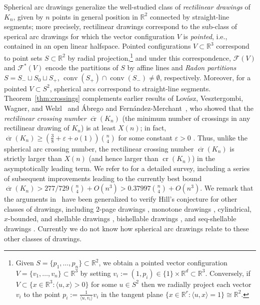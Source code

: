 \documentclass[11pt]{article}
\DeclareMathOperator{\conv}{conv}
\DeclareMathOperator{\cross}{cr}
\renewcommand{\geq}{\geqslant}
\newcommand{\R}{\mathbb{R}}
\begin{document}
%
Spherical arc drawings generalize the well-studied class of \emph{rectilinear drawings} of $K_n$, given by $n$ points in general position in $\R^2$ connected by straight-line segments; more precisely, rectilinear drawings correspond to the sub-class of sperical arc drawings for which the vector configuration $V$ is \emph{pointed}, i.e., contained in an open linear halfspace. Pointed configurations $V\subset \R^3$ correspond to point sets $S\subset \R^2$ by radial projection,\footnote{Given $S=\{p_1,\dots,p_n\} \subset \R^2$, we obtain a pointed vector configuration $V=\{v_1,\dots,v_n\} \subset \R^3$ by setting $v_i:=(1,p_i)\in \{1\}\times \R^d \subset \R^3$. Conversely, if $V \subset \{x \in \R^3\colon \langle u,x\rangle>0\}$ for some $u\in S^2$ then we radially project each vector $v_i$ to the point $p_i:=\frac{1}{\langle u, v_i\rangle} v_i$ in the tangent plane $\{x\in \R^r\colon \langle u,x\rangle = 1\} \cong \R^2$.}
and under this correspondence, $\mathcal{F}(V)$ and $\mathcal{F}^*(V)$ encode the partitions of $S$ by affine lines and \emph{Radon partitions} $S=S_-\sqcup S_0 \sqcup S_+$, $\conv(S_+) \cap \conv(S_-)\neq \emptyset$, respectively. Moreover, for a pointed $V \subset S^2$, spherical arcs correspond to straight-line segments.  
%
Theorem~\ref{thm:crossings} complements earlier results of Lov\'asz, Vesztergombi, Wagner, and Welzl~\cite{Lovasz:2004aa} and \'Abrego and Fern\'andez-Merchant~\cite{Abrego:2005aa}, who showed that the \emph{rectilinear crossing number} $\overline{\cross}(K_n)$ (the minimum number of crossings in any rectilinear drawing of $K_n$) is at least $X(n)$; in fact, $\overline{\cross}(K_n)\geq (\frac{3}{8}+\varepsilon+o(1))\binom{n}{4}$ for some constant $\varepsilon>0$ \cite{Lovasz:2004aa}. Thus, unlike the spherical arc crossing number, the rectilinear crossing number $\overline{\cross}(K_n)$ is strictly larger than $X(n)$ (and hence larger than $\cross(K_n)$) in the asymptotically leading term. We refer to  \cite{Abrego:2013ab} for a detailed survey, including a series of subsequent improvements \cite{Balogh:2006aa,Aichholzer:2007aa,Abrego:2008aa,Abrego:2008ab} leading to the currently best bound \cite{Abrego:2012aa} $\overline{\cross}(K_n) > 277/729 \binom{n}{4}+O(n^3) > 0.37997 \binom{n}{4}+O(n^3)$. We remark that the arguments in~\cite{Lovasz:2004aa,Abrego:2005aa} have been generalized to verify Hill's conjecture for other classes of drawings, including $2$-page drawings \cite{Abrego:2013aa}, monotone drawings \cite{Balko:2015aa}, cylindrical, $x$-bounded, and shellable drawings  \cite{Abrego:2014aa}, bishellable drawings \cite{Abrego:2018aa}, and seq-shellable drawings \cite{Mutzel:2018aa}. Currently we do not know %
how spherical arc drawings relate to these other classes of drawings.
%
\end{document}
